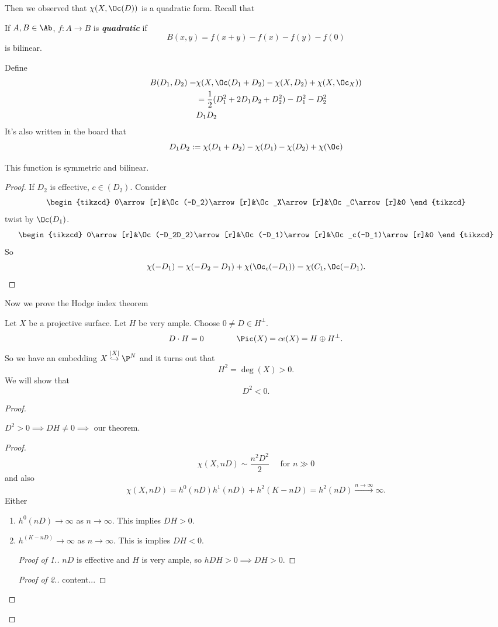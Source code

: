 Then we observed that $\chi(X,\Oc(D))$ is a quadratic form. Recall that
\begin{defn}
	If $A,B\in\Ab$, $f:A\to B$ is \textbf{\textit{quadratic}} if
	\[B(x,y)=f(x+y)-f(x)-f(y)-f(0)\]
	is bilinear.
\end{defn}
Define
\begin{align*}
	B(D_1,D_2)=&\chi(X,\Oc(D_1+D_2)-\chi(X,D_2)+\chi(X,\Oc_X))\\
	&=\frac{1}{2}(D_1^2+2D_1D_2+D_2^2)-D_1^2-D_2^2\\
	&D_1D_2
\end{align*}
It's also written in the board that
\[D_1D_2:=\chi(D_1+D_2)-\chi(D_1)-\chi(D_2)+\chi(\Oc)\]
\begin{claim}
	This function is symmetric and bilinear.
\end{claim}
\begin{proof}
	If $D_2$ is effective, $c\in (D_2)$. Consider
	\[\begin{tikzcd}
		0\arrow[r]&\Oc(-D_2)\arrow[r]&\Oc_X\arrow[r]&\Oc_C\arrow[r]&0
	\end{tikzcd}\]
	twist by $\Oc(D_1)$.
	\[\begin{tikzcd}
		0\arrow[r]&\Oc(-D_2D_2)\arrow[r]&\Oc(-D_1)\arrow[r]&\Oc_c(-D_1)\arrow[r]&0
	\end{tikzcd}\]
	So
	\[\chi(-D_1)=\chi(-D_2-D_1)+\chi(\Oc_c(-D_1))=\chi(C_1,\Oc(-D_1).\]
\end{proof}
Now we prove the Hodge index theorem
\begin{thm}
	Let $X$ be a projective surface. Let $H$ be very ample. Choose $0\neq D\in H^\perp$.
	\[D\cdot H=0\qquad\qquad \Pic(X)=ce(X)=H\oplus H^\perp.\]
	So we have an embedding $X\overset{|X|}{\hookrightarrow}\P^N$ and it turns out that
	\[H^2=\deg(X)>0.\]
	We will show that
	\[D^2<0.\]
\end{thm}
\begin{proof}
	\begin{claim}
		$D^2>0\implies DH\neq0\implies$ our theorem.
	\end{claim}
	\begin{proof}
		\[\chi(X,nD)\sim \frac{n^2D^2}{2}\quad\text{ for }n\gg 0\]
		and also
		\[\chi(X,nD)=h^0(nD)h^1(nD)+h^2(K-nD)=h^2(nD)\overset{n\to\infty}{\longrightarrow}\infty.\]
		Either
		\begin{enumerate}
			\item $h^0(nD)\to\infty$ as $n\to\infty$. This implies $DH>0$.
			\item $h^(K-nD)\to\infty$ as $n\to\infty$. This is implies $DH<0$.
			\begin{proof}[Proof of 1.]
				$nD$ is effective and $H$ is very ample, so $hDH>0\implies DH>0$.
			\end{proof}
			\begin{proof}[Proof of 2.]
				content...
			\end{proof}
		\end{enumerate}
	\end{proof}
\end{proof}

